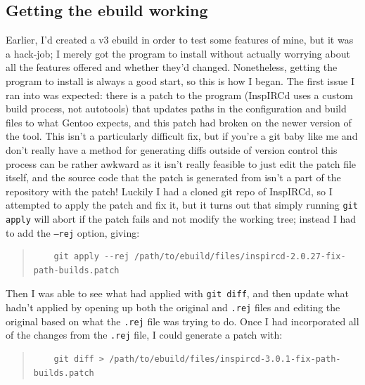 \documentclass{article}
\begin{document}
\subsection{Getting the ebuild working}
Earlier, I'd created a v3 ebuild in order to test some features of mine, but it was a hack-job; I merely got the program to install without actually worrying about all the features offered and whether they'd changed.  Nonetheless, getting the program to install is always a good start, so this is how I began.  The first issue I ran into was expected: there is a patch to the program (InspIRCd uses a custom build process, not autotools) that updates paths in the configuration and build files to what Gentoo expects, and this patch had broken on the newer version of the tool.  This isn't a particularly difficult fix, but if you're a git baby like me and don't really have a method for generating diffs outside of version control this process can be rather awkward as it isn't really feasible to just edit the patch file itself, and the source code that the patch is generated from isn't a part of the repository with the patch!  Luckily I had a cloned git repo of InspIRCd, so I attempted to apply the patch and fix it, but it turns out that simply running \texttt{git apply} will abort if the patch fails and not modify the working tree; instead I had to add the \texttt{--rej} option, giving:

\begin{quote}
\begin{verbatim}
	git apply --rej /path/to/ebuild/files/inspircd-2.0.27-fix-path-builds.patch
\end{verbatim}
\end{quote}

Then I was able to see what had applied with \texttt{git diff}, and then update what hadn't applied by opening up both the original and \texttt{.rej} files and editing the original based on what the \texttt{.rej} file was trying to do.  Once I had incorporated all of the changes from the \texttt{.rej} file, I could generate a patch with:

\begin{quote}
\begin{verbatim}
	git diff > /path/to/ebuild/files/inspircd-3.0.1-fix-path-builds.patch
\end{verbatim}
\end{quote}
\end{document}
